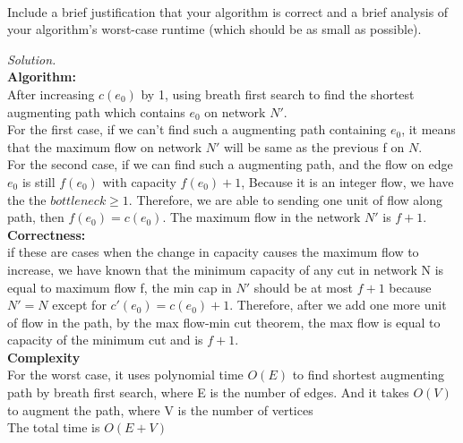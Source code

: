 \documentclass[10pt]{article}
\begin{document}
\begin{enumerate}
    \\
    Include a brief justification that your algorithm is correct and a brief analysis of your algorithm’s worst-case runtime (which should be as small as possible).
    \begin{mdframed}
        \textit{Solution.}\\
        \textbf{Algorithm:}\\
        After increasing $c(e_0)$ by 1, using breath first search to find the shortest augmenting path which contains $e_0$ on network $N'$.\\
        For the first case, if we can't find such a augmenting path containing $e_0$, it means that the maximum flow on network $N'$ will be same as the previous f on $N$.\\
        For the second case, if we can find such a augmenting path, and the flow on edge $e_0$ is still $f(e_0)$ with capacity $f(e_0)+1$, Because it is an integer flow, we have the the $bottleneck \geq 1$. Therefore, we are able to sending one unit of flow along path, then $f(e_0) = c(e_0)$. The maximum flow in the network $N'$ is $f+1$.\\
        \textbf{Correctness:}\\
        if these are cases when the change in capacity causes the maximum flow to increase, we have known that the minimum capacity of any cut in network N is equal to maximum flow f, the min cap in $N'$ should be at most $f+1$ because $N' = N$ except for $c'(e_0) = c(e_0) + 1$. Therefore, after we add one more unit of flow in the path, by the max flow-min cut theorem, the max flow is equal to capacity of the minimum cut and is $f+1$.\\
        \textbf{Complexity}\\
        For the worst case, it uses polynomial time $O(E)$ to find shortest augmenting path by breath first search, where E is the number of edges. And it takes $O(V)$ to augment the path, where V is the number of vertices\\
        The total time is $O(E+V)$
    \end{mdframed}
\end{enumerate}
\end{document}
